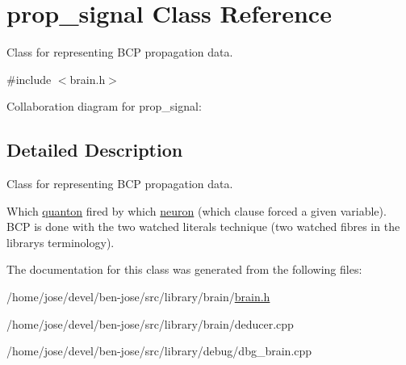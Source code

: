 \hypertarget{classprop__signal}{}\section{prop\+\_\+signal Class Reference}
\label{classprop__signal}


Class for representing B\+CP propagation data.  




{\ttfamily \#include $<$brain.\+h$>$}



Collaboration diagram for prop\+\_\+signal\+:


\subsection{Detailed Description}
Class for representing B\+CP propagation data. 

Which \hyperlink{classquanton}{quanton} fired by which \hyperlink{classneuron}{neuron} (which clause forced a given variable). B\+CP is done with the two watched literals technique (two watched fibres in the library\textquotesingle{}s terminology). 

The documentation for this class was generated from the following files\+:\begin{DoxyCompactItemize}
\item 
/home/jose/devel/ben-\/jose/src/library/brain/\hyperlink{brain_8h}{brain.\+h}\item 
/home/jose/devel/ben-\/jose/src/library/brain/deducer.\+cpp\item 
/home/jose/devel/ben-\/jose/src/library/debug/dbg\+\_\+brain.\+cpp\end{DoxyCompactItemize}
